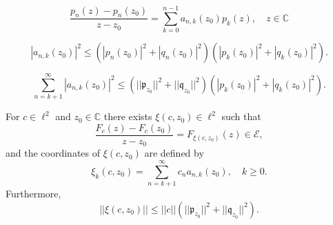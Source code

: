 \documentclass[10pt,a4paper]{amsart}
\newcommand{\C}{\mathbb{C}}
\begin{document}
\begin{equation}\label{eq:1}
\frac{p_n(z)-p_n(z_0)}{z-z_0}=\sum_{k=0}^{n-1} a_{n,k}(z_0)p_k(z), \quad z\in\C
\end{equation}

\begin{equation}\label{eq:3}
|a_{n,k}(z_0)|^2\le \left(|p_n(z_0)|^2+|q_n(z_0)|^2\right)\left(|p_k(z_0)|^2+|q_k(z_0)|^2\right).
\end{equation}

\begin{equation}\label{eq:3bis}
\sum_{n=k+1}^\infty |a_{n,k}(z_0)|^2\le (||\mathfrak{p}_{z_0}||^2+||\mathfrak{q}_{z_0}||^2)(|p_k(z_0)|^2+|q_k(z_0)|^2).
\end{equation}

\begin{thm}\label{thm:deB} For $c\in\ell^2$  and $z_0\in\C$ there exists $\xi(c,z_0)\in\ell^2$ such that
\begin{equation}\label{eq:Fcq}
\frac{F_c(z)-F_c(z_0)}{z-z_0}=F_{\xi(c,z_0)}(z) \in\mathcal E, 
\end{equation}
and the coordinates of $\xi(c,z_0)$ are defined by 
\begin{equation}\label{eq:xi}
\xi_k(c,z_0)=\sum_{n=k+1}^\infty c_n a_{n,k}(z_0),\quad k\ge 0.
\end{equation}
Furthermore,
\begin{equation}\label{eq:normxi}
||\xi(c,z_0)|| \le ||c||\left(||\mathfrak{p}_{z_0}||^2+||\mathfrak{q}_{z_0}||^2\right).
\end{equation}
\end{thm}
\end{document}
